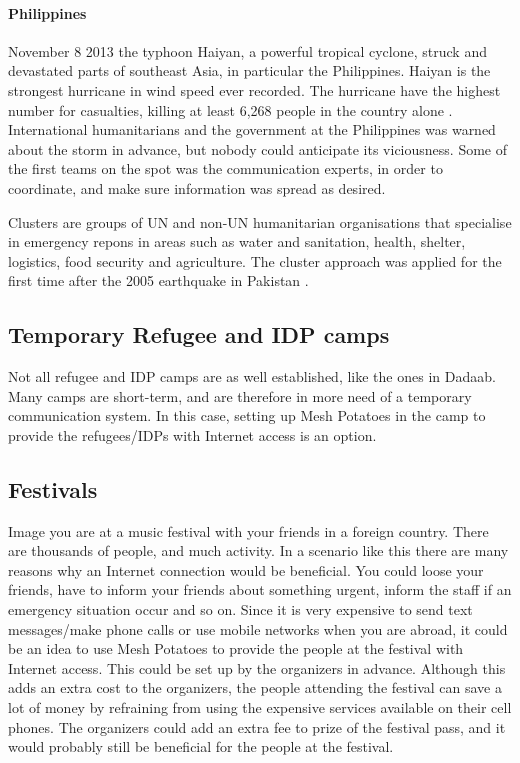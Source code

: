 \paragraph{Philippines}
November 8 2013 the typhoon Haiyan, a powerful tropical cyclone, struck and devastated parts of southeast Asia, in particular the Philippines. Haiyan is the strongest hurricane in wind speed ever recorded. The hurricane have the highest number for casualties, killing at least 6,268 people in the country alone \cite{wikiHaiyan}. International humanitarians and the government at the Philippines was warned about the storm in advance, but nobody could anticipate its viciousness. Some of the first teams on the spot was the communication experts, in order to coordinate, and make sure information was spread as desired.    \cite{disasterResponse} 

Clusters are groups of UN and non-UN humanitarian organisations that specialise in emergency repons in areas such as water and sanitation, health, shelter, logistics, food security and agriculture. The cluster approach was applied for the first time after the 2005 earthquake in Pakistan \cite{disasterResponse}.

\subsection{Temporary Refugee and IDP camps}
Not all refugee and IDP camps are as well established, like the ones in Dadaab. Many camps are short-term, and are therefore in more need of a temporary communication system. In this case, setting up Mesh Potatoes in the camp to provide the refugees/IDPs with Internet access is an option. 

\subsection{Festivals}
Image you are at a music festival with your friends in a foreign country. There are thousands of people, and much activity. In a scenario like this there are many reasons why an Internet connection would be beneficial. You could loose your friends, have to inform your friends about something urgent, inform the staff if an emergency situation occur and so on. Since it is very expensive to send text messages/make phone calls or use mobile networks when you are abroad, it could be an idea to use Mesh Potatoes to provide the people at the festival with Internet access. This could be set up by the organizers in advance. Although this adds an extra cost to the organizers, the people attending the festival can save a lot of money by refraining from using the expensive services available on their cell phones. The organizers could add an extra fee to prize of the festival pass, and it would probably still be beneficial for the people at the festival. 

